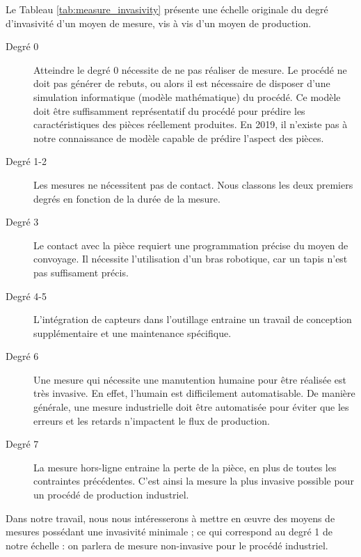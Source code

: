 \noindent
Le Tableau \ref{tab:measure_invasivity} présente une échelle originale du degré d'invasivité d'un moyen de mesure, vis à vis d'un moyen de production.

\begin{description}
	\item[Degré 0] Atteindre le degré 0 nécessite de ne pas réaliser de mesure.
	Le procédé ne doit pas générer de rebuts, ou alors il est nécessaire de disposer d'une simulation informatique (modèle mathématique) du procédé.
	Ce modèle doit être suffisamment représentatif du procédé pour prédire les caractéristiques des pièces réellement produites.
	En 2019, il n'existe pas à notre connaissance de modèle capable de prédire l'aspect des pièces.
	\item[Degré 1-2] Les mesures ne nécessitent pas de contact. Nous classons les deux premiers degrés en fonction de la durée de la mesure.
	\item[Degré 3] Le contact avec la pièce requiert une programmation précise du moyen de convoyage.
	Il nécessite l'utilisation d'un bras robotique, car un tapis n'est pas suffisament précis.
	\item[Degré 4-5] L'intégration de capteurs dans l'outillage entraine un travail de conception supplémentaire et une maintenance spécifique.
	\item[Degré 6] Une mesure qui nécessite une manutention humaine pour être réalisée est très invasive.
	En effet, l'humain est difficilement automatisable.
	De manière générale, une mesure industrielle doit être automatisée pour éviter que les erreurs et les retards n'impactent le flux de production.
	\item[Degré 7] La mesure hors-ligne entraine la perte de la pièce, en plus de toutes les contraintes précédentes. C'est ainsi la mesure la plus invasive possible pour un procédé de production industriel.
\end{description} 

\noindent
Dans notre travail, nous nous intéresserons à mettre en œuvre des moyens de mesures possédant une invasivité minimale ; ce qui correspond au degré 1 de notre échelle : on parlera de mesure non-invasive pour le procédé industriel.


